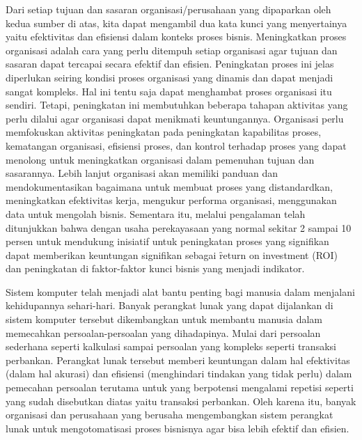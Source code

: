 Dari setiap tujuan dan sasaran organisasi/perusahaan yang dipaparkan oleh kedua sumber di atas, kita dapat mengambil dua kata kunci yang menyertainya yaitu efektivitas dan efisiensi dalam konteks proses bisnis. Meningkatkan proses organisasi adalah cara yang perlu ditempuh setiap organisasi agar tujuan dan sasaran dapat tercapai secara efektif dan efisien. Peningkatan proses ini jelas diperlukan seiring kondisi proses organisasi yang dinamis dan dapat menjadi sangat kompleks. Hal ini tentu saja dapat menghambat proses organisasi itu sendiri. Tetapi, peningkatan ini membutuhkan beberapa tahapan aktivitas yang perlu dilalui agar organisasi dapat menikmati keuntungannya. Organisasi perlu memfokuskan aktivitas peningkatan pada peningkatan kapabilitas proses, kematangan organisasi, efisiensi proses, dan kontrol terhadap proses yang dapat menolong untuk meningkatkan organisasi dalam pemenuhan tujuan dan sasarannya. Lebih lanjut organisasi akan memiliki panduan dan mendokumentasikan bagaimana untuk membuat proses yang distandardkan, meningkatkan efektivitas kerja, mengukur performa organisasi, menggunakan data untuk mengolah bisnis. Sementara itu, melalui pengalaman telah ditunjukkan bahwa dengan usaha perekayasaan yang normal sekitar 2 sampai 10 persen untuk mendukung inisiatif untuk peningkatan proses yang signifikan dapat memberikan keuntungan signifikan sebagai \f{return on investment} (ROI) dan peningkatan di faktor-faktor kunci bisnis yang menjadi indikator\cite{reqm.distilled}.

Sistem komputer telah menjadi alat bantu penting bagi manusia dalam menjalani kehidupannya sehari-hari. Banyak perangkat lunak yang dapat dijalankan di sistem komputer tersebut dikembangkan untuk membantu manusia dalam memecahkan persoalan-persoalan yang dihadapinya. Mulai dari persoalan sederhana seperti kalkulasi sampai persoalan yang kompleks seperti transaksi perbankan. Perangkat lunak tersebut memberi keuntungan dalam hal efektivitas (dalam hal akurasi) dan efisiensi (menghindari tindakan yang tidak perlu) dalam pemecahan persoalan terutama untuk yang berpotensi mengalami repetisi seperti yang sudah disebutkan diatas yaitu transaksi perbankan. Oleh karena itu, banyak organisasi dan perusahaan yang berusaha mengembangkan sistem perangkat lunak untuk mengotomatisasi proses bisnisnya agar bisa lebih efektif dan efisien.

